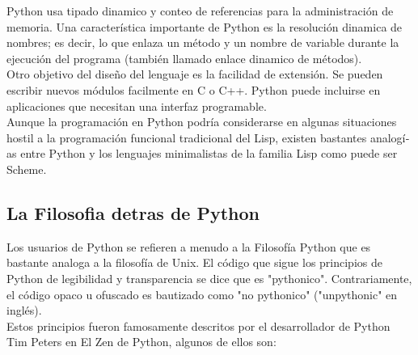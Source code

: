 Python usa tipado dinamico y conteo de referencias para la administración de memoria. Una caracterí­stica importante de Python es la resolución dinamica de nombres;  es decir, lo que enlaza un método y un nombre de variable durante la ejecución  del programa (también llamado enlace dinamico de métodos). \\[0.1cm]
  
Otro objetivo del diseño del lenguaje es la facilidad de extensión. Se pueden escribir nuevos módulos facilmente en C o C++. Python puede incluirse en aplicaciones que necesitan una interfaz programable. \\[0.1cm]

Aunque la programación en Python podría considerarse en algunas situaciones hostil a la programación funcional tradicional del Lisp, existen bastantes analogí­as entre Python y los lenguajes minimalistas de la familia Lisp como puede ser Scheme. \\[0.1cm]


\subsection{La Filosofia detras de Python}

Los usuarios de Python se refieren a menudo a la Filosofí­a Python que es bastante analoga a la filosofí­a de Unix. El código que sigue los principios de Python de legibilidad y transparencia se dice que es "pythonico". Contrariamente, el código opaco u ofuscado es bautizado como "no pythonico" ("unpythonic" en inglés). \\[0.1cm]

Estos principios fueron famosamente descritos por el desarrollador de Python Tim Peters en El Zen de Python, algunos de ellos son: \\[0.1cm]

